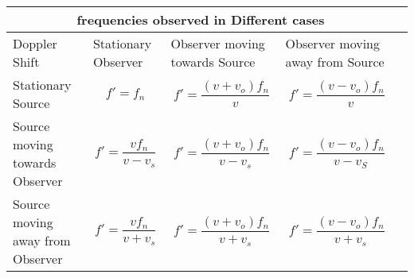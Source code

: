 
\setlength{\arrayrulewidth}{0.5mm}
\setlength{\tabcolsep}{14pt}
\renewcommand{\arraystretch}{0.8}


\begin{tabular}{ |p{1cm}|p{1cm}|p{1.5cm}|p{1.5cm}|p{}}
    \hline
    \multicolumn{4}{|c|}{frequencies observed in Different cases} \\
    \hline
    Doppler Shift &Stationary Observer &Observer moving towards Source &Observer moving away from Source\\
    \hline
    Stationary Source & $$f' = f_n$$& $$f' = \frac{(v+v_o) f_n}{v}$$&$$f' = \frac{(v-v_o) f_n}{v}$$\\
    \hline
    Source moving towards Observer &$$f' = \frac{v f_n}{v-v_s }$$&$$f' = \frac{(v+v_o) f_n}{v- v_s }$$&$$f' = \frac{(v-v_o) f_n}{v- v_S }$$\\
    \hline
    Source moving away from Observer&$$f' = \frac{v f_n}{v+ v_s }$$&$$f' = \frac{(v+v_o) f_n}{v+ v_s }$$&$$f' = \frac{(v-v_o) f_n}{v+ v_s }$$\\
    \hline
    \end{tabular}\\
\caption{}
\label{Table:3}